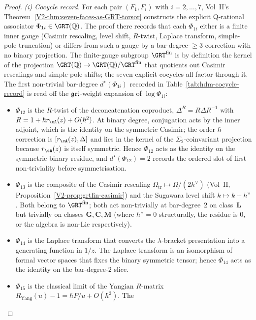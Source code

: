\begin{proof}
\emph{(i) Cocycle record.} For each pair $(F_1,F_i)$ with
$i=2,\dots,7$, Vol~II's
Theorem~\ref{V2-thm:seven-faces-as-GRT-torsor} constructs the explicit
Q-rational associator $\Phi_{1i}\in\GRT(\mathbb{Q})$. The proof
there records that each $\Phi_{1i}$ either is a finite inner gauge
(Casimir rescaling, level shift, $R$-twist, Laplace transform,
simple-pole truncation) or differs from such a gauge by a
bar-degree-$\geq 3$ correction with no binary projection. The
finite-gauge subgroup $\GRT^{\mathrm{fin}}$ is by definition the
kernel of the projection
$\GRT(\mathbb{Q})\to\GRT(\mathbb{Q})/\GRT^{\mathrm{fin}}$ that
quotients out Casimir rescalings and simple-pole shifts; the seven
explicit cocycles all factor through it. The first non-trivial
bar-degree $d^\star(\Phi_{1i})$ recorded in
Table~\ref{tab:hdm-cocycle-record} is read off the $\mathfrak{grt}$-weight
expansion of $\log\Phi_{1i}$:
\begin{itemize}
\item $\Phi_{12}$ is the $R$-twist of the deconcatenation coproduct,
$\Delta^R = R\Delta R^{-1}$ with $R = 1+\hbar r_\cA(z)+O(\hbar^2)$. At
binary degree, conjugation acts by the inner adjoint, which is the
identity on the symmetric Casimir; the order-$\hbar$ correction is
$[r_\cA(z),\Delta]$ and lies in the kernel of the
$\Sigma_2$-coinvariant projection because $r_\cA(z)$ is itself
symmetric. Hence $\Phi_{12}$ acts as the identity on the symmetric
binary residue, and $d^\star(\Phi_{12})=2$ records the ordered slot
of first-non-triviality before symmetrisation.
\item $\Phi_{13}$ is the composite of the Casimir rescaling
$\Omega_{\mathrm{tr}}\mapsto\Omega/(2h^\vee)$
(Vol~II, Proposition~\ref{V2-prop:grtfin-casimir}) and the
Sugawara level shift $k\mapsto k+h^\vee$. Both belong to
$\GRT^{\mathrm{fin}}$; both act non-trivially at bar-degree~$2$ on
class~$\mathbf{L}$ but trivially on classes $\mathbf{G},\mathbf{C},\mathbf{M}$
(where $h^\vee=0$ structurally, the residue is $0$, or the algebra
is non-Lie respectively).
\item $\Phi_{14}$ is the Laplace transform that converts the
$\lambda$-bracket presentation into a generating function in $1/z$.
The Laplace transform is an isomorphism of formal vector spaces
that fixes the binary symmetric tensor; hence $\Phi_{14}$ acts as
the identity on the bar-degree-$2$ slice.
\item $\Phi_{15}$ is the classical limit of the Yangian
$R$-matrix $R_{\mathrm{Yang}}(u)-1=\hbar P/u+O(\hbar^2)$. The

\end{itemize}
\end{proof}

